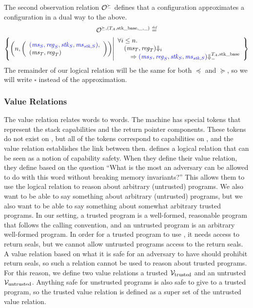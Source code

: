 \begin{jversion}
The second observation relation $\lro[\succeq]$ defines that a \trgcm{} configuration approximates a \srccm{} configuration in a dual way to the above.
\begin{multline*}
  \lro[\succeq,(\ta,\stkb,\_,\_)] \defeq \\\left\{ \npair{\left(\array{l}\src{(\ms_S,\reg_S,\stk_S,\ms_{\stk,S})},\\(\ms_T,\reg_T)\endarray\right)} \middle|
    \begin{array}{l}
      \forall i \leq n \ldotp \\ 
      \quad (\ms_T ,\reg_T) \term[i] \\\qquad\Rightarrow \src{(\ms_S,\reg_S,\stk_S,\ms_{\stk,S})} \sterm{\ta,\stkb}
    \end{array}
\right\}
\end{multline*}
The remainder of our logical relation will be the same for both $\preceq$ and $\succeq$, so we will write $\square$ instead of the approximation.

\subsubsection{Value Relations}
The value relation relates \trgcm{} words to \srccm{} words.
The \srccm{} machine has special tokens that represent the stack capabilities and the return pointer components.
These tokens do not exist on \trgcm{}, but all of the tokens correspond to capabilities on \trgcm{}, and the value relation establishes the link between then.
\citet{skorstengaard_reasoning_2017} defines a logical relation that can be seen as a notion of capability safety.
When they define their value relation, they define based on the question ``What is the most an adversary can be allowed to do with this word without breaking memory invariants?''
This allows them to use the logical relation to reason about arbitrary (untrusted) programs.
We also want to be able to say something about arbitrary (untrusted) programs, but we also want to be able to say something about somewhat arbitrary trusted programs.
In our setting, a trusted program is a well-formed, reasonable program that follows the \stktokens{} calling convention, and an untrusted program is an arbitrary well-formed program.
In order for a trusted program to use \stktokens{}, it needs access to return seals, but we cannot allow untrusted programs access to the return seals.
A value relation based on what it is safe for an adversary to have should prohibit return seals, so such a relation cannot be used to reason about trusted programs.
For this reason, we define two value relations a trusted $\lrvname_{\trusted}$ and an untrusted $\lrvname_{\untrusted}$.
Anything safe for unstrusted programs is also safe to give to a trusted program, so the trusted value relation is defined as a super set of the untrusted value relation.


\end{jversion}
